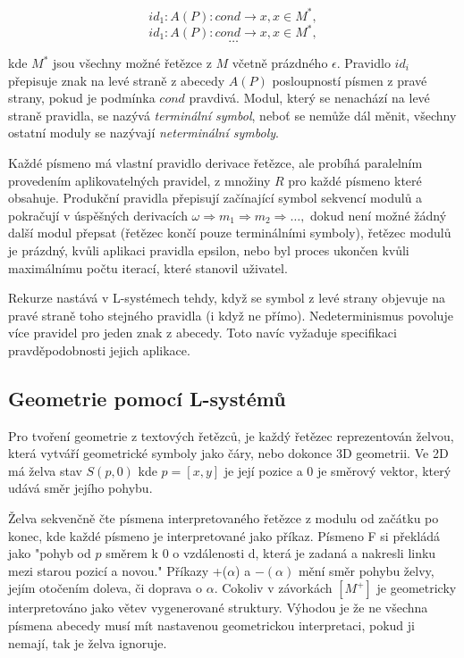 \[id_1:A(P):cond\rightarrow x,x \in M^*,\]
\[id_1:A(P):cond\rightarrow x,x \in M^*,\]
\[\ldots\]

kde $M^*$ jsou všechny možné řetězce z $M$ včetně prázdného $\epsilon$. Pravidlo $id_i$ přepisuje znak na levé straně z abecedy $A(P)$ posloupností písmen z pravé strany, pokud je podmínka $cond$ pravdivá. Modul, který se nenachází na levé straně pravidla, se nazývá \textit{terminální symbol}, neboť se nemůže dál měnit, všechny ostatní moduly se nazývají \textit{neterminální symboly}.\cite{prusinkiewicz2012algorithmic}

Každé písmeno má vlastní pravidlo derivace řetězce, ale probíhá paralelním provedením aplikovatelných pravidel, z množiny $R$ pro každé písmeno které obsahuje. Produkční pravidla přepisují začínající symbol sekvencí modulů a pokračují v úspěšných derivacích $\omega \Rightarrow m_1 \Rightarrow m_2 \Rightarrow \ldots,$ dokud není možné žádný další modul přepsat (řetězec končí pouze terminálními symboly), řetězec modulů je prázdný, kvůli aplikaci pravidla epsilon, nebo byl proces ukončen kvůli maximálnímu počtu iterací, které stanovil uživatel.\cite{lindenmayer1968mathematical}

Rekurze nastává v L-systémech tehdy, když se symbol z levé strany objevuje na pravé straně toho stejného pravidla (i když ne přímo). Nedeterminismus povoluje více pravidel pro jeden znak z abecedy. Toto navíc vyžaduje specifikaci pravděpodobnosti jejich aplikace.\cite{LINDENMAYER1968280}

\subsection{Geometrie pomocí L-systémů}
\label{lsystemGeometry}
Pro tvoření geometrie z textových řetězců, je každý řetězec reprezentován želvou, která vytváří geometrické symboly jako čáry, nebo dokonce 3D geometrii.
Ve 2D má želva stav $S(p,0)$ kde $p=[x,y]$ je její pozice a $0$ je směrový vektor, který udává směr jejího pohybu. 

Želva sekvenčně čte písmena interpretovaného řetězce z modulu od začátku po konec, kde každé písmeno je interpretované jako příkaz. Písmeno F si překládá jako "pohyb od $p$ směrem k $0$ o vzdálenosti d, která je zadaná a nakresli linku mezi starou pozicí a novou." Příkazy +($\alpha$) a $-(\alpha)$ mění směr pohybu želvy, jejím otočením doleva, či doprava o $\alpha$. Cokoliv v závorkách $[M^+]$ je geometricky interpretováno jako větev vygenerované struktury. Výhodou je že ne všechna písmena abecedy musí mít nastavenou geometrickou interpretaci, pokud ji nemají, tak je želva ignoruje.
\cite{prusinkiewicz1986graphical}


